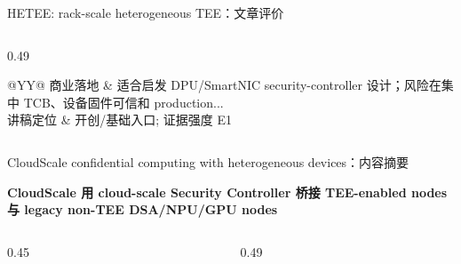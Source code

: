 \begin{frame}[t,shrink=6]{HETEE: rack-scale heterogeneous TEE：文章评价}
\begin{columns}[T,totalwidth=\textwidth]
\begin{column}{0.49\textwidth}
{\begin{minipage}[t]{0.97\linewidth}
\begin{minipage}{0.92\linewidth}
{\begin{tabularx}{\linewidth}{@{}YY@{}}
商业落地 & 适合启发 DPU/SmartNIC security-controller 设计；风险在集中 TCB、设备固件可信和 production... \\
讲稿定位 & 开创/基础入口; 证据强度 E1 \\
\bottomrule
\end{tabularx}
}
    \end{minipage}
    \vspace{1mm}
  \end{minipage}}
  \end{column}
\end{columns}
\end{frame}


\begin{frame}[t,shrink=6]{CloudScale confidential computing with heterogeneous devices：内容摘要}
{\large\bfseries\color{Ink} CloudScale 用 cloud-scale Security Controller 桥接 TEE-enabled nodes 与 legacy non-TEE DSA/NPU/GPU nodes\par}\vspace{1.2mm}
\begin{columns}[T,totalwidth=\textwidth]
  \begin{column}{0.45\textwidth}
  \end{column}
  \begin{column}{0.49\textwidth}
\end{column}
\end{columns}
\end{frame}
